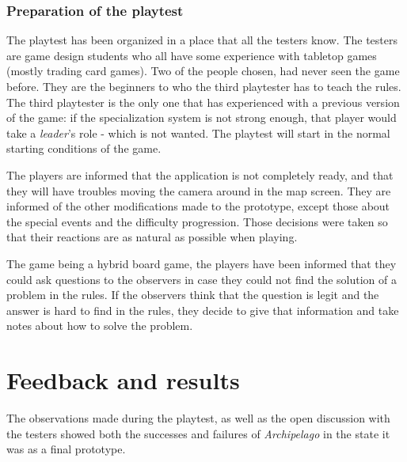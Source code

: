 \subsubsection{Preparation of the playtest}
The playtest has been organized in a place that all the testers know. The testers are game design students who all have  some experience with tabletop games (mostly trading card games). Two of the people chosen, had never seen the game before. They are the beginners to who the third playtester has to teach the rules. The third playtester is the only one that has experienced with a previous version of the game: if the specialization system is not strong enough, that player would take a \textit{leader}'s role - which is not wanted. The playtest will start in the normal starting conditions of the game.

The players are informed that the application is not completely ready, and that they will have troubles moving the camera around in the map screen. They are informed of the other modifications made to the prototype, except those about the special events and the difficulty progression. Those decisions were taken so that their reactions are as natural as possible when playing.

The game being a hybrid board game, the players have been informed that they could ask questions to the observers in case they could not find the solution of a problem in the rules. If the observers think that the question is legit and the answer is hard to find in the rules, they decide to give that information and take notes about how to solve the problem. 

\section{Feedback and results}

The observations made during the playtest, as well as the open discussion with the testers showed both the successes and failures of \textit{Archipelago} in the state it was as a final prototype. 
 
